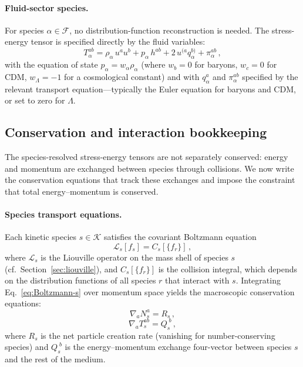 \paragraph{Fluid-sector species.}

For species $\alpha \in \mathcal{F}$, no
distribution-function reconstruction is needed.  The
stress-energy tensor is specified directly by the fluid
variables:
\begin{equation}\label{eq:fluid-Tab}
T_\alpha^{ab}
= \rho_\alpha\, u^a u^b
  + p_\alpha\, h^{ab}
  + 2\,u^{(a} q_\alpha^{b)}
  + \pi_\alpha^{ab}\,,
\end{equation}
with the equation of state $p_\alpha = w_\alpha
\rho_\alpha$ (where $w_b = 0$ for baryons,
$w_c = 0$ for CDM, $w_\Lambda = -1$ for a cosmological
constant) and with $q_\alpha^a$ and $\pi_\alpha^{ab}$
specified by the relevant transport equation---typically
the Euler equation for baryons and CDM, or set to zero
for $\Lambda$.


\subsection{Conservation and interaction bookkeeping}
\label{sec:species-conservation}

The species-resolved stress-energy tensors are not
separately conserved: energy and momentum are exchanged
between species through collisions.  We now write the
conservation equations that track these exchanges and
impose the constraint that total energy--momentum is
conserved.


\paragraph{Species transport equations.}

Each kinetic species $s \in \mathcal{K}$ satisfies the
covariant Boltzmann equation
\begin{equation}\label{eq:Boltzmann-s}
\mathcal{L}_s[f_s] = C_s[\{f_r\}]\,,
\end{equation}
where $\mathcal{L}_s$ is the Liouville operator on the
mass shell of species $s$
(cf.\ Section~\ref{sec:liouville}), and $C_s[\{f_r\}]$
is the collision integral, which depends on the
distribution functions of all species $r$ that interact
with $s$.  Integrating Eq.~\eqref{eq:Boltzmann-s} over
momentum space yields the macroscopic conservation
equations:
\begin{equation}\label{eq:number-conservation}
\nabla_a N_s^a = R_s\,,
\end{equation}
\begin{equation}\label{eq:energy-conservation}
\nabla_a T_s^{ab} = Q_s^{\;b}\,,
\end{equation}
where $R_s$ is the net particle creation rate
(vanishing for number-conserving species) and
$Q_s^{\;b}$ is the energy--momentum exchange four-vector
between species $s$ and the rest of the medium.

